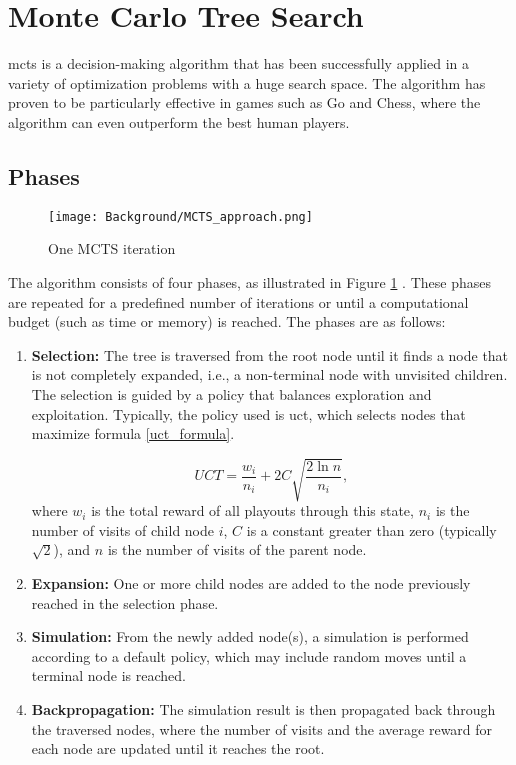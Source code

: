 \section{Monte Carlo Tree Search}

\ac{mcts} is a decision-making algorithm that has been successfully applied in a variety of optimization problems with a huge search space. The algorithm has proven to be particularly effective in games such as Go and Chess, where the algorithm can even outperform the best human players.

\subsection{Phases}

\begin{figure}
      \centering
      \texttt{[image: Background/MCTS\_approach.png]}
      \caption[MCTS approach]
      {One MCTS iteration \cite{browne_survey_2012}}
      \label{fig:mcts_approach}
\end{figure}

The algorithm consists of four phases, as illustrated in Figure \ref{fig:mcts_approach}  \cite{browne_survey_2012}. These phases are repeated for a predefined number of iterations or until a computational budget (such as time or memory) is reached. The phases are as follows:

\begin{enumerate}
	\item \textbf{Selection:} The tree is traversed from the root node until it finds a node that is not completely expanded, i.e., a non-terminal node with unvisited children. The selection is guided by a policy that balances exploration and exploitation. Typically, the policy used is \ac{uct}, which selects nodes that maximize formula \ref{uct_formula}.
	 
	\begin{equation}
	UCT = \frac{w_i}{n_i} + 2C\sqrt{\frac{2\ln{n}}{n_i}},\label{uct_formula}
	\end{equation} where \(w_i\) is the total reward of all playouts through this state, \(n_i\) is the number of visits of child node \(i\), \(C\) is a constant greater than zero (typically \(\sqrt{2}\)), and \(n\) is the number of visits of the parent node.
    \item \textbf{Expansion:} One or more child nodes are added to the node previously reached in the selection phase.
    \item \textbf{Simulation:} From the newly added node(s), a simulation is performed according to a default policy, which may include random moves until a terminal node is reached.
    \item \textbf{Backpropagation:} The simulation result is then propagated back through the traversed nodes, where the number of visits and the average reward for each node are updated until it reaches the root.
\end{enumerate}

